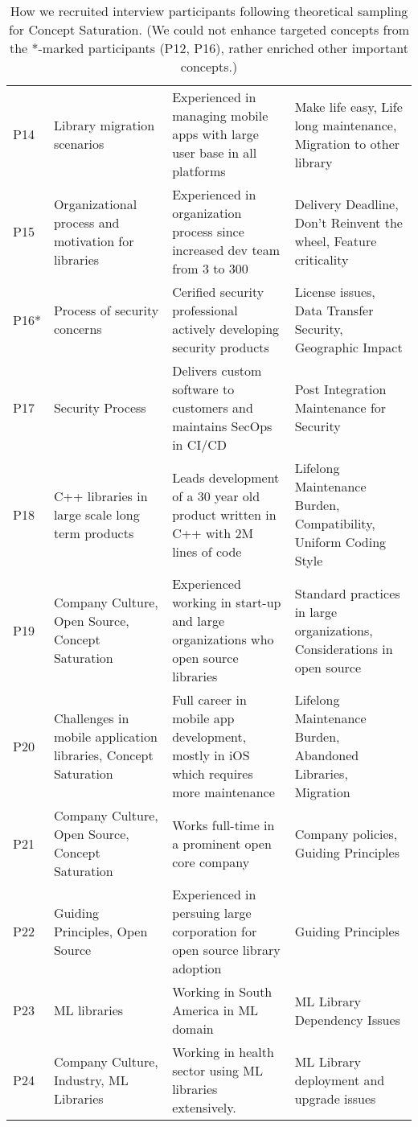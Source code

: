 \begin{table*}[]
\begin{tabular}{p{.4cm}p{4cm}p{6cm}p{6cm}}
P14 & Library migration scenarios & Experienced in managing mobile apps with large user base in all platforms & Make life easy, Life long maintenance, Migration to other library \\ 
P15 & Organizational process and motivation for libraries & Experienced in organization process since increased dev team from 3 to 300 & Delivery Deadline, Don't Reinvent the wheel, Feature criticality \\ 
P16* & Process of security concerns & Cerified security professional actively developing security products & License issues, Data Transfer Security, Geographic Impact  \\ 
P17 & Security Process & Delivers custom software to customers and maintains SecOps in CI/CD & Post Integration Maintenance for Security \\ 
P18 & C++ libraries in large scale long term products & Leads development of a 30 year old product written in C++ with 2M lines of code & Lifelong Maintenance Burden, Compatibility, Uniform Coding Style \\ 
P19 & Company Culture, Open Source, Concept Saturation & Experienced working in start-up and large organizations who open source libraries & Standard practices in large organizations, Considerations in open source \\ 
P20 & Challenges in mobile application libraries, Concept Saturation & Full career in mobile app development, mostly in iOS which requires more maintenance & Lifelong Maintenance Burden, Abandoned Libraries, Migration \\ 
P21 & Company Culture, Open Source, Concept Saturation & Works full-time in a prominent open core company & Company policies, Guiding Principles \\ 
P22 & Guiding Principles, Open Source & Experienced in persuing large corporation for open source library adoption & Guiding Principles \\ 
P23 & ML libraries & Working in South America in ML domain & ML Library Dependency Issues \\ 
P24 & Company Culture, Industry, ML Libraries & Working in health sector using ML libraries extensively. & ML Library deployment and upgrade issues \\ 

\bottomrule
    \end{tabular}
    \caption{How we recruited interview participants following theoretical sampling for Concept Saturation. (We could not enhance targeted concepts from the *-marked participants (P12, P16), rather enriched other important concepts.)}
    \label{tab:theoritcal-sampling}
\end{table*}